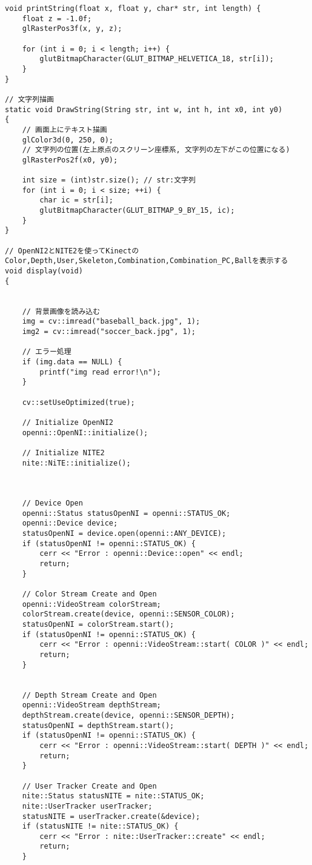 \begin{lstlisting}
void printString(float x, float y, char* str, int length) {
	float z = -1.0f;
	glRasterPos3f(x, y, z);

	for (int i = 0; i < length; i++) {
		glutBitmapCharacter(GLUT_BITMAP_HELVETICA_18, str[i]);
	}
}

// 文字列描画
static void DrawString(String str, int w, int h, int x0, int y0)
{
	// 画面上にテキスト描画
	glColor3d(0, 250, 0); 
	// 文字列の位置(左上原点のスクリーン座標系, 文字列の左下がこの位置になる)
	glRasterPos2f(x0, y0); 

	int size = (int)str.size(); // str:文字列
	for (int i = 0; i < size; ++i) {
		char ic = str[i];
		glutBitmapCharacter(GLUT_BITMAP_9_BY_15, ic);
	}
}

// OpenNI2とNITE2を使ってKinectのColor,Depth,User,Skeleton,Combination,Combination_PC,Ballを表示する
void display(void)
{


	// 背景画像を読み込む
	img = cv::imread("baseball_back.jpg", 1);
	img2 = cv::imread("soccer_back.jpg", 1);

	// エラー処理
	if (img.data == NULL) {
		printf("img read error!\n");
	}

	cv::setUseOptimized(true);

	// Initialize OpenNI2
	openni::OpenNI::initialize();

	// Initialize NITE2 
	nite::NiTE::initialize();



	// Device Open
	openni::Status statusOpenNI = openni::STATUS_OK;
	openni::Device device;
	statusOpenNI = device.open(openni::ANY_DEVICE);
	if (statusOpenNI != openni::STATUS_OK) {
		cerr << "Error : openni::Device::open" << endl;
		return;
	}

	// Color Stream Create and Open
	openni::VideoStream colorStream;
	colorStream.create(device, openni::SENSOR_COLOR);
	statusOpenNI = colorStream.start();
	if (statusOpenNI != openni::STATUS_OK) {
		cerr << "Error : openni::VideoStream::start( COLOR )" << endl;
		return;
	}


	// Depth Stream Create and Open
	openni::VideoStream depthStream;
	depthStream.create(device, openni::SENSOR_DEPTH);
	statusOpenNI = depthStream.start();
	if (statusOpenNI != openni::STATUS_OK) {
		cerr << "Error : openni::VideoStream::start( DEPTH )" << endl;
		return;
	}

	// User Tracker Create and Open
	nite::Status statusNITE = nite::STATUS_OK;
	nite::UserTracker userTracker;
	statusNITE = userTracker.create(&device);
	if (statusNITE != nite::STATUS_OK) {
		cerr << "Error : nite::UserTracker::create" << endl;
		return;
	}


\end{lstlisting}
